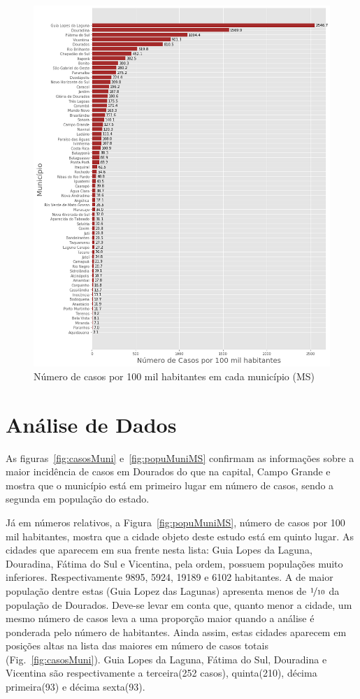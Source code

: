 \documentclass[12pt]{article}
\begin{document}
\begin{figure}[!htb]
  \centering
  \includegraphics[width=1\textwidth]{figs/casos_100_mil_por_municipio.png}
  \caption{Número de casos por 100 mil habitantes em cada município (MS)}
  \label{fig:casosMuni100k}
  \end{figure}

\section{Análise de Dados}\label{sec:dados}

As figuras~\ref{fig:casosMuni} e~\ref{fig:popuMuniMS} confirmam as informações sobre a  maior incidência de casos em Dourados do que na capital, Campo Grande e mostra que o município está em primeiro lugar em número de casos, sendo a segunda em população do estado.

Já em números relativos, a Figura~\ref{fig:popuMuniMS}, número de casos por 100 mil habitantes, mostra que a cidade objeto deste estudo está em quinto lugar. As cidades que aparecem em sua frente nesta lista: Guia Lopes da Laguna, Douradina, Fátima do Sul e Vicentina, pela ordem, possuem populações muito inferiores. Respectivamente 9895, 5924, 19189 e  6102 habitantes. A de maior população dentre estas (Guia Lopez das Lagunas) apresenta menos de \(\nicefrac{1}{10}\) da população de Dourados. Deve-se levar em conta que, quanto menor a cidade, um mesmo número de casos leva a uma proporção maior quando a análise é ponderada pelo número de habitantes. Ainda assim, estas cidades aparecem em posições altas na lista das maiores em número de casos totais (Fig.~\ref{fig:casosMuni}). Guia Lopes da Laguna, Fátima do Sul, Douradina e Vicentina são respectivamente a terceira(252 casos), quinta(210), décima primeira(93) e décima sexta(93). 
\end{document}
